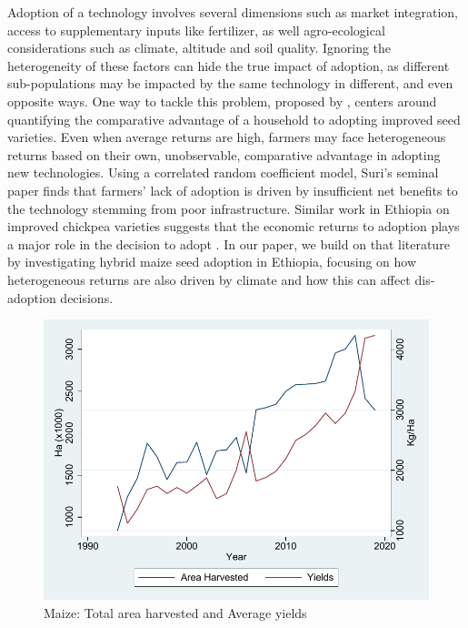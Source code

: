 \documentclass{article}
\begin{document}
Adoption of a technology involves several dimensions such as market integration, access to supplementary inputs like fertilizer, as well agro-ecological considerations such as climate, altitude and soil quality. Ignoring the heterogeneity of these factors can hide the true impact of adoption, as different sub-populations may be impacted by the same technology in different, and even opposite ways. One way to tackle this problem, proposed by \citep{Suri2011-oi}, centers around quantifying the comparative advantage of a household to adopting improved seed varieties. Even when average returns are high, farmers may face heterogeneous returns based on their own, unobservable, comparative advantage in adopting new technologies. Using a correlated random coefficient model, Suri’s seminal paper finds that farmers’ lack of adoption is driven by insufficient net benefits to the technology stemming from poor infrastructure. Similar work in Ethiopia on improved chickpea varieties suggests that the economic returns to adoption plays a major role in the decision to adopt \citep{Michler2018-wk}. In our paper, we build on that literature by investigating hybrid maize seed adoption in Ethiopia, focusing on how heterogeneous returns are also driven by climate and how this can affect dis-adoption decisions.


\begin{figure}
    \centering
    \includegraphics{results/figures/Maize_yields.pdf}
    \caption{Maize: Total area harvested and Average yields}
    \label{fig:maize_yields}
\end{figure}
\end{document}
